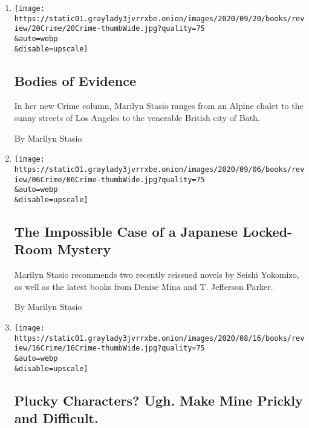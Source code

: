 \begin{enumerate}
\def\labelenumi{\arabic{enumi}.}
\item
  \href{/2020/09/11/books/review/crime-fiction-ruth-ware-peter-lovesey.html}{}

  \texttt{[image: https://static01.graylady3jvrrxbe.onion/images/2020/09/20/books/review/20Crime/20Crime-thumbWide.jpg?quality=75\\\&auto=webp\\\&disable=upscale]}

  \hypertarget{bodies-of-evidence}{%
  \subsection{Bodies of Evidence}\label{bodies-of-evidence}}

  In her new Crime column, Marilyn Stasio ranges from an Alpine chalet
  to the sunny streets of Los Angeles to the venerable British city of
  Bath.

  By Marilyn Stasio
\item
  \href{/2020/09/04/books/review/crime-fiction-denise-mina-t-jefferson-parker.html}{}

  \texttt{[image: https://static01.graylady3jvrrxbe.onion/images/2020/09/06/books/review/06Crime/06Crime-thumbWide.jpg?quality=75\\\&auto=webp\\\&disable=upscale]}

  \hypertarget{the-impossible-case-of-a-japanese-locked-room-mystery}{%
  \subsection{The Impossible Case of a Japanese Locked-Room
  Mystery}\label{the-impossible-case-of-a-japanese-locked-room-mystery}}

  Marilyn Stasio recommends two recently reissued novels by Seishi
  Yokomizo, as well as the latest books from Denise Mina and T.
  Jefferson Parker.

  By Marilyn Stasio
\item
  \href{/2020/08/14/books/review/crime-fiction-stasio-jeff-abbott-never-ask-me.html}{}

  \texttt{[image: https://static01.graylady3jvrrxbe.onion/images/2020/08/16/books/review/16Crime/16Crime-thumbWide.jpg?quality=75\\\&auto=webp\\\&disable=upscale]}

  \hypertarget{plucky-characters-ugh-make-mine-prickly-and-difficult}{%
  \subsection{Plucky Characters? Ugh. Make Mine Prickly and
  Difficult.}\label{plucky-characters-ugh-make-mine-prickly-and-difficult}}


\end{enumerate}
